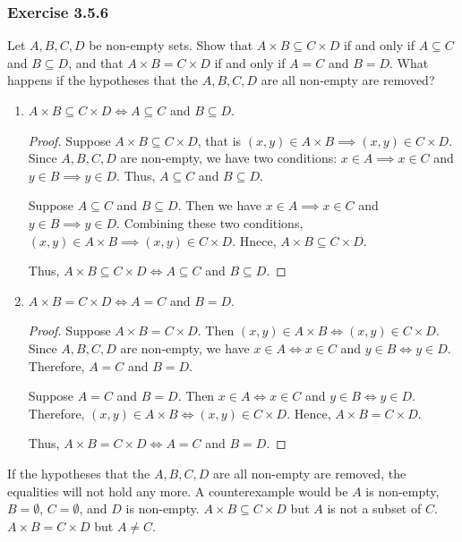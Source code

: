 \documentclass[12pt, letter]{article}
\begin{document}
\subsubsection*{Exercise 3.5.6}
Let $A,B,C,D$ be non-empty sets. Show that $A\times B\subseteq C\times D$ if and only if $A\subseteq C$ and $B\subseteq D$, and that $A\times B=C\times D$ if and only if $A=C$ and $B=D$. 
What happens if the hypotheses that the $A,B,C,D$ are all non-empty are removed?
\begin{enumerate}
    \item $A\times B\subseteq C\times D\iff A\subseteq C$ and $B\subseteq D$.
    \begin{proof}
        Suppose $A\times B\subseteq C\times D$, that is $(x,y)\in A\times B\implies (x,y)\in C\times D$. Since $A,B,C,D$ are non-empty, we have two conditions: $x\in A\implies x\in C$ and
        $y\in B\implies y\in D$. Thus, $A\subseteq C$ and $B\subseteq D$.

        Suppose $A\subseteq C$ and $B\subseteq D$. Then we have $x\in A\implies x\in C$ and $y\in B\implies y\in D$. Combining these two conditions, $(x,y)\in A\times B\implies (x,y)\in C\times D$.
        Hnece, $A\times B\subseteq C\times D$.

        Thus, $A\times B\subseteq C\times D\iff A\subseteq C$ and $B\subseteq D$.
    \end{proof}
    \item $A\times B=C\times D\iff A=C$ and $B=D$.
    \begin{proof}
        Suppose $A\times B=C\times D$. Then $(x,y)\in A\times B\iff (x,y)\in C\times D$. Since $A,B,C,D$ are non-empty, we have $x\in A\iff x\in C$ and 
        $y\in B\iff y\in D$. Therefore, $A=C$ and $B=D$.

        Suppose $A=C$ and $B=D$. Then $x\in A\iff x\in C$ and $y\in B\iff y\in D$. Therefore, $(x,y)\in A\times B\iff (x,y)\in C\times D$. Hence, $A\times B=C\times D$.

        Thus, $A\times B=C\times D\iff A=C$ and $B=D$.
    \end{proof}
\end{enumerate}
If the hypotheses that the $A,B,C,D$ are all non-empty are removed, the equalities will not hold any more. A counterexample would be $A$ is non-empty, $B=\emptyset$, $C=\emptyset$, and $D$ is non-empty. 
$A\times B\subseteq C\times D$ but $A$ is not a subset of $C$. $A\times B=C\times D$ but $A\ne C$.
\end{document}
